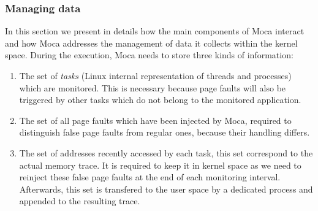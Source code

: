 

\subsubsection{Managing data}
\label{sec:design-tech}

In this section we present in details how the main components of \gls{Moca}
interact and how \gls{Moca} addresses the management of data it collects
within the kernel space.
During the execution, \gls{Moca} needs to store three kinds of information:
\begin{enumerate}
    \item The set of \emph{tasks} (Linux internal representation of threads and processes) which are
monitored. This is necessary because page faults will also be triggered by other tasks which do not belong to
the monitored application.
    \item The set of all page faults which have been injected by \gls{Moca},
        required to distinguish false page faults from regular ones, because their handling differs.
    \item The set of addresses recently accessed by each task, this set
        correspond to the actual memory trace. It is required to keep it in
        kernel space as we need to reinject these false page faults at the end of each monitoring interval. Afterwards,
        this set is transfered to the user space by a dedicated process and appended to the resulting trace.
\end{enumerate}

